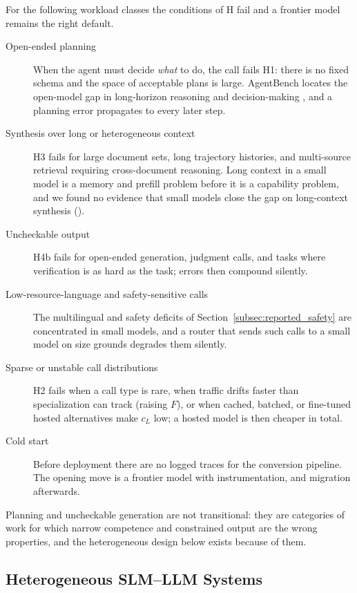 For the following workload classes the conditions of H fail and a frontier model remains the right default.

\begin{description}
  \item[Open-ended planning] When the agent must decide \emph{what} to do, the call fails H1: there is no fixed schema and the space of acceptable plans is large. AgentBench locates the open-model gap in long-horizon reasoning and decision-making \citep{liu2024agentbench}, and a planning error propagates to every later step.
  \item[Synthesis over long or heterogeneous context] H3 fails for large document sets, long trajectory histories, and multi-source retrieval requiring cross-document reasoning. Long context in a small model is a memory and prefill problem before it is a capability problem, and we found no evidence that small models close the gap on long-context synthesis (\evD).
  \item[Uncheckable output] H4b fails for open-ended generation, judgment calls, and tasks where verification is as hard as the task; errors then compound silently.
  \item[Low-resource-language and safety-sensitive calls] The multilingual and safety deficits of Section~\ref{subsec:reported_safety} are concentrated in small models, and a router that sends such calls to a small model on size grounds degrades them silently.
  \item[Sparse or unstable call distributions] H2 fails when a call type is rare, when traffic drifts faster than specialization can track (raising $F$), or when cached, batched, or fine-tuned hosted alternatives make $c_L$ low; a hosted model is then cheaper in total.
  \item[Cold start] Before deployment there are no logged traces for the conversion pipeline. The opening move is a frontier model with instrumentation, and migration afterwards.
\end{description}

Planning and uncheckable generation are not transitional: they are categories of work for which narrow competence and constrained output are the wrong properties, and the heterogeneous design below exists because of them.

\subsection{Heterogeneous SLM--LLM Systems}
\label{subsec:agentic_hetero}

